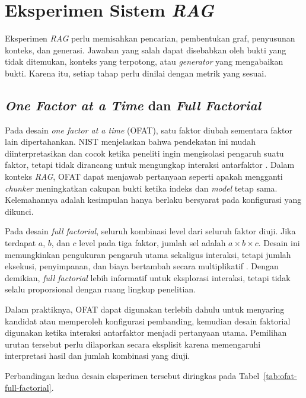 \section{Eksperimen Sistem \emph{RAG}}

Eksperimen \emph{RAG} perlu memisahkan pencarian, pembentukan graf, penyusunan konteks, dan generasi.
Jawaban yang salah dapat disebabkan oleh bukti yang tidak ditemukan, konteks yang terpotong,
atau \emph{generator} yang mengabaikan bukti. Karena itu, setiap tahap perlu dinilai dengan metrik yang
sesuai.

\subsection{\emph{One Factor at a Time} dan \emph{Full Factorial}}

Pada desain \emph{one factor at a time} (OFAT), satu faktor diubah sementara faktor lain dipertahankan. NIST menjelaskan bahwa pendekatan ini mudah diinterpretasikan dan cocok ketika peneliti ingin mengisolasi pengaruh suatu faktor, tetapi tidak dirancang untuk mengungkap interaksi antarfaktor \parencite{nistOneFactorAtATime}. Dalam konteks \emph{RAG}, OFAT dapat menjawab pertanyaan seperti apakah mengganti \emph{chunker} meningkatkan cakupan bukti ketika indeks dan \emph{model} tetap sama. Kelemahannya adalah kesimpulan hanya berlaku bersyarat pada konfigurasi yang dikunci.

Pada desain \emph{full factorial}, seluruh kombinasi level dari seluruh faktor diuji. Jika terdapat $a$, $b$, dan $c$ level pada tiga faktor, jumlah sel adalah $a\times b\times c$. Desain ini memungkinkan pengukuran pengaruh utama sekaligus interaksi, tetapi jumlah eksekusi, penyimpanan, dan biaya bertambah secara multiplikatif \parencite{nistFullFactorialDesign}. Dengan demikian, \emph{full factorial} lebih informatif untuk eksplorasi interaksi, tetapi tidak selalu proporsional dengan ruang lingkup penelitian.

Dalam praktiknya, OFAT dapat digunakan terlebih dahulu untuk menyaring kandidat atau memperoleh konfigurasi pembanding, kemudian desain faktorial digunakan ketika interaksi antarfaktor menjadi pertanyaan utama. Pemilihan urutan tersebut perlu dilaporkan secara eksplisit karena memengaruhi interpretasi hasil dan jumlah kombinasi yang diuji.

\noindent Perbandingan kedua desain eksperimen tersebut diringkas pada Tabel~\ref{tab:ofat-full-factorial}.

